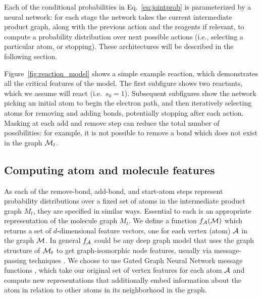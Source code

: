 Each of the conditional probabilities in Eq.~\eqref{eq:jointprob} is parameterized by a neural network:
for each stage the network takes the current intermediate product graph, 
along with the previous action and the reagents if relevant, 
to compute a probability distribution over next possible actions (i.e., selecting a particular atom, or stopping).
These architectures will be described in the following section.

Figure~\ref{fig:reaction_model} shows a simple example reaction, which demonstrates all the critical features of the model.
The first subfigure shows two reactants, which we assume will react (i.e.\ $s_0 = 1$).
Subsequent subfigures show the network picking an initial atom to begin the electron path,
and then iteratively selecting atoms for removing and adding bonds, potentially stopping after each action.
Masking at each add and remove step can reduce the total number of possibilities: 
for example, it is not possible to remove a bond which does not exist in the graph ${\mathcal{M}}_t$.

\subsection{Computing atom and molecule features}


As each of the remove-bond, add-bond, and start-atom steps represent probability distributions over a fixed set of atoms in the intermediate product graph $M_t$, they are specified in similar ways.
Essential to each is an appropriate representation of the molecule graph $M_t$.
We define a function $f_{{\mathcal{A}}} ({\mathcal{M}})$ which returns a set of $d$-dimensional feature vectors, 
one for each vertex (atom) ${\mathcal{A}}$ in the graph ${\mathcal{M}}$.
In general $f_{{\mathcal{A}}}$ could be any deep graph model that uses the graph structure of ${\mathcal{M}}_t$ to get graph-isomorphic node features, usually via message-passing techniques \citep{gilmer2017neural}. 
We choose to use Gated Graph Neural Network message functions \citep{li2016gated},
which take our original set of vertex features for each atom ${\mathcal{A}}$ and compute new representations that
additionally embed information about the atom in relation to other atoms in its neighborhood in the graph.

